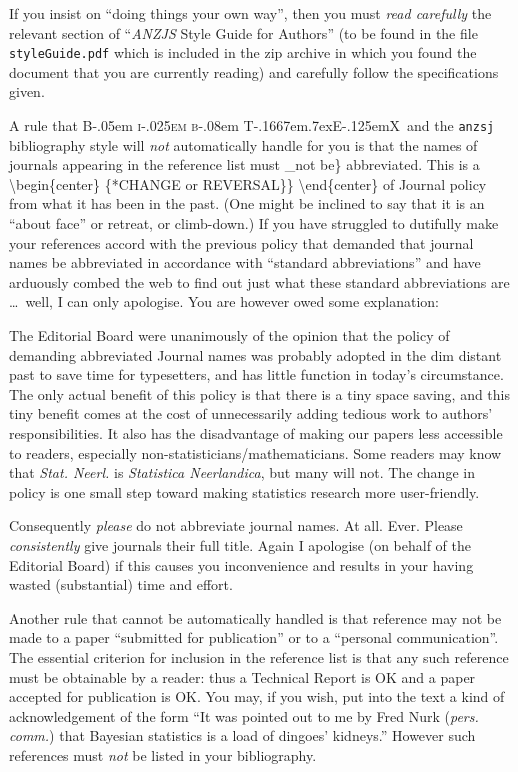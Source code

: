 \documentclass[
  times,
  doublespace]{anzsauth}
\newcommand\BibTeX{{\rmfamily B\kern-.05em \textsc{i\kern-.025em b}\kern-.08em
T\kern-.1667em\lower.7ex\hbox{E}\kern-.125emX}}
\begin{document}
If you insist on ``doing things your own way'', then you must \emph{read
carefully} the relevant section of ``\emph{ANZJS} Style Guide for
Authors'' (to be found in the file \texttt{styleGuide.pdf} which is
included in the zip archive in which you found the document that you are
currently reading) and carefully follow the specifications given.

A rule that \BibTeX~and the \texttt{anzsj} bibliography style will
\emph{not} automatically handle for you is that the names of journals
appearing in the reference list must \_not be\} abbreviated. This is a
\textbackslash begin\{center\} \{\large **CHANGE or REVERSAL\}\}
\textbackslash end\{center\} of Journal policy from what it has been in
the past. (One might be inclined to say that it is an ``about face'' or
retreat, or climb-down.) If you have struggled to dutifully make your
references accord with the previous policy that demanded that journal
names be abbreviated in accordance with ``standard abbreviations'' and
have arduously combed the web to find out just what these standard
abbreviations are \ldots~well, I can only apologise. You are however
owed some explanation:

The Editorial Board were unanimously of the opinion that the policy of
demanding abbreviated Journal names was probably adopted in the dim
distant past to save time for typesetters, and has little function in
today's circumstance. The only actual benefit of this policy is that
there is a tiny space saving, and this tiny benefit comes at the cost of
unnecessarily adding tedious work to authors' responsibilities. It also
has the disadvantage of making our papers less accessible to readers,
especially non-statisticians/mathematicians. Some readers may know that
\emph{Stat. Neerl.} is \emph{Statistica Neerlandica}, but many will not.
The change in policy is one small step toward making statistics research
more user-friendly.

Consequently \emph{please} do not abbreviate journal names. At all.
Ever. Please \emph{consistently} give journals their full title. Again I
apologise (on behalf of the Editorial Board) if this causes you
inconvenience and results in your having wasted (substantial) time and
effort.

Another rule that cannot be automatically handled is that reference may
not be made to a paper ``submitted for publication'' or to a ``personal
communication''. The essential criterion for inclusion in the reference
list is that any such reference must be obtainable by a reader: thus a
Technical Report is OK and a paper accepted for publication is OK. You
may, if you wish, put into the text a kind of acknowledgement of the
form ``It was pointed out to me by Fred Nurk (\emph{pers. comm.}) that
Bayesian statistics is a load of dingoes' kidneys.'' However such
references must \emph{not} be listed in your bibliography.
\end{document}
